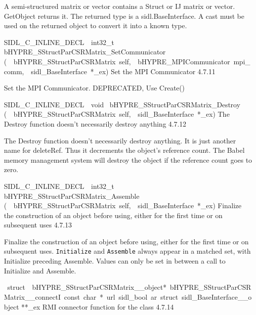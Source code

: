 \documentclass{article}
\begin{document}
\begin{cxxentry}
\begin{cxxentry}
\begin{cxxfunction}
\begin{cxxdoc}
A semi-structured matrix or vector contains a Struct or IJ matrix
or vector.  GetObject returns it.
The returned type is a sidl.BaseInterface.
A cast must be used on the returned object to convert it into a known type.
\end{cxxdoc}
\end{cxxfunction}
\begin{cxxfunction}
{SIDL\_C\_INLINE\_DECL\ \ int32\_t\ }
        {bHYPRE\_SStructParCSRMatrix\_SetCommunicator}
        {(\ \ bHYPRE\_SStructParCSRMatrix\ self,\ \ bHYPRE\_MPICommunicator\ mpi\_comm,\ \ sidl\_BaseInterface\ *\_ex)}
        {
Set the MPI Communicator}
        {4.7.11}
\begin{cxxdoc}

Set the MPI Communicator.  DEPRECATED, Use Create()
\end{cxxdoc}
\end{cxxfunction}
\begin{cxxfunction}
{SIDL\_C\_INLINE\_DECL\ \ void\ }
        {bHYPRE\_SStructParCSRMatrix\_Destroy}
        {(\ \ bHYPRE\_SStructParCSRMatrix\ self,\ \ sidl\_BaseInterface\ *\_ex)}
        {
The Destroy function doesn't necessarily destroy anything}
        {4.7.12}
\begin{cxxdoc}

The Destroy function doesn't necessarily destroy anything.
It is just another name for deleteRef.  Thus it decrements the
object's reference count.  The Babel memory management system will
destroy the object if the reference count goes to zero.
\end{cxxdoc}
\end{cxxfunction}
\begin{cxxfunction}
{SIDL\_C\_INLINE\_DECL\ \ int32\_t\ }
        {bHYPRE\_SStructParCSRMatrix\_Assemble}
        {(\ \ bHYPRE\_SStructParCSRMatrix\ self,\ \ sidl\_BaseInterface\ *\_ex)}
        {
Finalize the construction of an object before using, either
for the first time or on subsequent uses}
        {4.7.13}
\begin{cxxdoc}

Finalize the construction of an object before using, either
for the first time or on subsequent uses. {\tt Initialize}
and {\tt Assemble} always appear in a matched set, with
Initialize preceding Assemble. Values can only be set in
between a call to Initialize and Assemble.
\end{cxxdoc}
\end{cxxfunction}
\begin{cxxvariable}
{\ struct\ \ bHYPRE\_SStructParCSRMatrix\_\_object*\ bHYPRE\_SStructParCSRMatrix\_\_connectI\ const\ char\ *\ url\ sidl\_bool\ ar\ struct\ sidl\_BaseInterface\_\_object}
        {**\_ex}
        {}
        {
RMI connector function for the class}
        {4.7.14}
\begin{cxxdoc}


\end{cxxdoc}
\end{cxxvariable}
\end{cxxentry}
\end{cxxentry}
\end{document}
